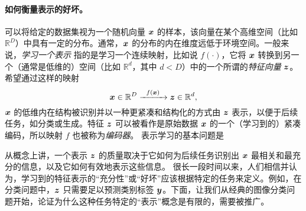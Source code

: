 \documentclass[../../book-main_zh.tex]{subfiles}
\begin{document}
\paragraph{如何衡量表示的好坏。}
可以将给定的数据集视为一个随机向量 $\bm{x}$ 的样本，该向量在某个高维空间（比如 $\mathbb{R}^D$）中具有一定的分布。通常，$\bm{x}$ 的分布的内在维度远低于环境空间。一般来说，{\em 学习一个表示} 指的是学习一个连续映射，比如说 $f(\cdot)$，它将 $\bm{x}$ 转换到另一个（通常是低维的）空间（比如 $\mathbb{R}^d$，其中 $d < D$）中的一个所谓的{\em 特征向量} $\bm{z}$。希望通过这样的映射
\begin{equation}
	\bm{x} \in \mathbb{R}^D \xrightarrow{\hspace{2mm} f(\bm{x})\hspace{2mm}} \bm{z}  \in \mathbb{R}^d,
	\label{eqn:chap4-1-encoding}
\end{equation}
$\bm{x}$ 的低维内在结构被识别并以一种更紧凑和结构化的方式由 $\bm{z}$ 表示，以便于后续任务，如分类或生成。特征 $\bm{z}$ 可以被看作是原始数据 $\bm{x}$ 的一个（学习到的）紧凑编码，所以映射 $f$ 也被称为\textit{编码器}。
表示学习的基本问题是
\begin{center}
\end{center}

从概念上讲，一个表示 $\bm{z}$ 的质量取决于它如何为后续任务识别出 $\bm{x}$ 最相关和最充分的信息，以及它如何有效地表示这些信息。
很长一段时间以来，人们相信并认为，学习到的特征表示的“充分性”或“好坏”应该根据特定的任务来定义。例如，在分类问题中，$\bm{z}$ 只需要足以预测类别标签 $\bm{y}$。下面，让我们从经典的图像分类问题开始，论证为什么这种任务特定的“表示”概念是有限的，需要被推广。

\end{document}
